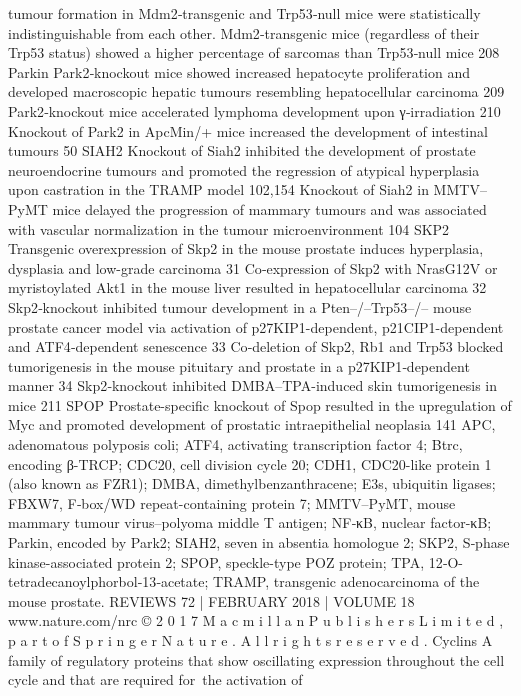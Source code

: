 tumour formation in Mdm2‑transgenic and Trp53‑null mice were statistically indistinguishable
from each other. Mdm2‑transgenic mice (regardless of their Trp53 status) showed a higher
percentage of sarcomas than Trp53‑null mice
208
Parkin
Park2‑knockout mice showed increased hepatocyte proliferation and developed macroscopic
hepatic tumours resembling hepatocellular carcinoma
209
Park2‑knockout mice accelerated lymphoma development upon γ‑irradiation
210
Knockout of Park2 in ApcMin/+ mice increased the development of intestinal tumours
50
SIAH2
Knockout of Siah2 inhibited the development of prostate neuroendocrine tumours and
promoted the regression of atypical hyperplasia upon castration in the TRAMP model
102,154
Knockout of Siah2 in MMTV–PyMT mice delayed the progression of mammary tumours and
was associated with vascular normalization in the tumour microenvironment
104
SKP2
Transgenic overexpression of Skp2 in the mouse prostate induces hyperplasia, dysplasia and
low-grade carcinoma
31
Co‑expression of Skp2 with NrasG12V or myristoylated Akt1 in the mouse liver resulted in
hepatocellular carcinoma
32
Skp2‑knockout inhibited tumour development in a Pten–/–Trp53–/– mouse prostate cancer
model via activation of p27KIP1-dependent, p21CIP1-dependent and ATF4‑dependent
senescence
33
Co‑deletion of Skp2, Rb1 and Trp53 blocked tumorigenesis in the mouse pituitary and prostate
in a p27KIP1‑dependent manner
34
Skp2‑knockout inhibited DMBA–TPA-induced skin tumorigenesis in mice
211
SPOP
Prostate-specific knockout of Spop resulted in the upregulation of Myc and promoted
development of prostatic intraepithelial neoplasia
141
APC, adenomatous polyposis coli; ATF4, activating transcription factor 4; Btrc, encoding β-TRCP; CDC20, cell division cycle 20;
CDH1, CDC20-like protein 1 (also known as FZR1); DMBA, dimethylbenzanthracene; E3s, ubiquitin ligases; FBXW7, F‑box/WD
repeat-containing protein 7; MMTV–PyMT, mouse mammary tumour virus–polyoma middle T antigen; NF‑κB, nuclear factor-κB;
Parkin, encoded by Park2; SIAH2, seven in absentia homologue 2; SKP2, S‑phase kinase-associated protein 2; SPOP, speckle-type
POZ protein; TPA, 12‑O-tetradecanoylphorbol‑13‑acetate; TRAMP, transgenic adenocarcinoma of the mouse prostate.
REVIEWS
72 | FEBRUARY 2018 | VOLUME 18
www.nature.com/nrc
©
 2
0
1
7
 M
a
c
m
i
l
l
a
n
 P
u
b
l
i
s
h
e
r
s
 L
i
m
i
t
e
d
,
 p
a
r
t
 o
f
 S
p
r
i
n
g
e
r
 N
a
t
u
r
e
.
 A
l
l
 r
i
g
h
t
s
 r
e
s
e
r
v
e
d
.
Cyclins
A family of regulatory proteins
that show oscillating
expression throughout the cell
cycle and that are required
for the activation of
